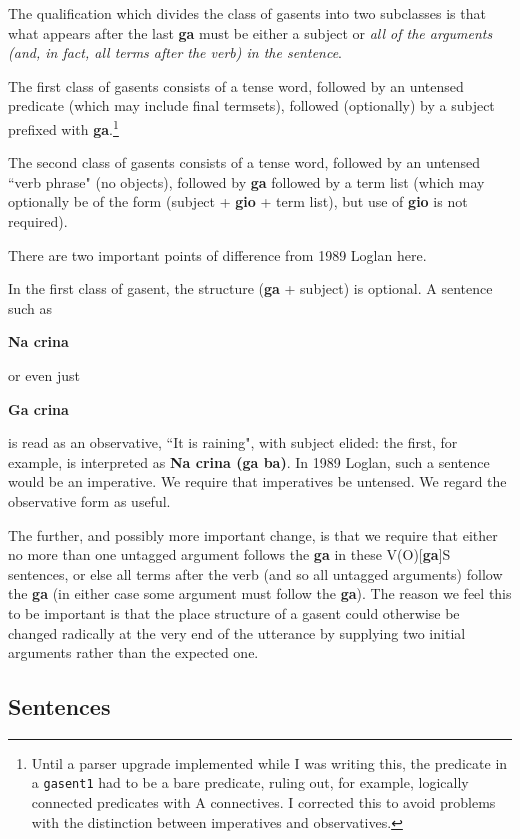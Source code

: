 \documentclass[12pt]{book}
\begin{document}
{The qualification which divides the class of gasents into two subclasses is that what appears after the last {\bf ga} must be either a subject or
{\em all of the arguments  (and, in fact, all terms after the verb) in the sentence\/}. 

The first class of gasents consists of a tense word, followed by an untensed predicate (which may include final termsets), followed (optionally) by a subject prefixed with {\bf ga}.\footnote{Until a parser upgrade implemented while I was writing this, the predicate in a {\tt gasent1} had to be a bare predicate, ruling out, for example, logically connected predicates with A connectives.   I corrected this to avoid problems with the distinction between imperatives and observatives.}

The second class of gasents consists of a tense word, followed by an untensed ``verb phrase" (no objects), followed by {\bf ga} followed by a term list
(which may optionally be of the form (subject + {\bf gio} + term list), but use of {\bf gio} is not required).

There are two important points of difference from 1989 Loglan here.

In the first class of gasent, the structure ({\bf ga} + subject) is optional.  A sentence such as

{\bf Na crina}

or even just

{\bf Ga crina}

is read as an observative, ``It is raining", with subject elided:  the first, for example,  is interpreted as {\bf Na crina (ga ba)}.  In 1989 Loglan, such a sentence would be an imperative.  We require that
imperatives be untensed.  We regard the observative form as useful.

The further, and possibly more important change, is that we require that either no more than one untagged argument  follows the {\bf ga} in
these V(O)[{\bf ga}]S sentences, or else all terms after the verb (and so all untagged arguments) follow the {\bf ga} (in either case some argument must follow the {\bf ga}).  The reason we feel this to be important is that the place structure of a gasent could otherwise be changed radically at the very end of the utterance by supplying two initial arguments rather than the expected one.



\subsection{Sentences}

}
\end{document}
